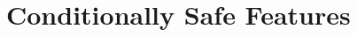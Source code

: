 
\chapter[Conditionally Safe Features]{Conditionally Safe Features}\label{ch-conditional}

\renewcommand{\cppxx}{C++11}

\newpage
{}


\newpage


\newpage
%


\newpage


\newpage



